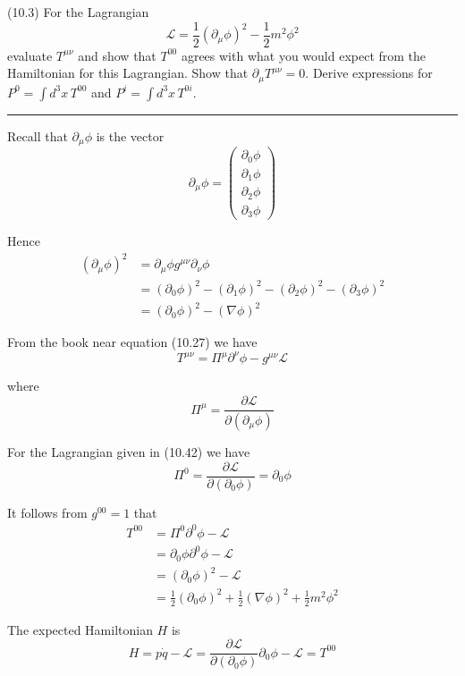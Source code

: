 \documentclass[12pt]{article}
\begin{document}
(10.3)
For the Lagrangian
\begin{equation*}
\mathcal L=\frac{1}{2}(\partial_\mu\phi)^2-\frac{1}{2}m^2\phi^2
\tag{10.42}
\end{equation*}
evaluate $T^{\mu\nu}$ and show that $T^{00}$ agrees with what
you would expect from the Hamiltonian for this Lagrangian.
Show that $\partial_\mu T^{\mu\nu}=0$. Derive expressions
for $P^0=\int d^3x\,T^{00}$ and $P^i=\int d^3x\,T^{0i}$.

\bigskip
\hrule

\bigskip
Recall that $\partial_\mu\phi$ is the vector
\begin{equation*}
\partial_\mu\phi=\begin{pmatrix}
\partial_0\phi
\\
\partial_1\phi
\\
\partial_2\phi
\\
\partial_3\phi
\end{pmatrix}
\end{equation*}

Hence
\begin{align*}
(\partial_\mu\phi)^2
&=\partial_\mu\phi g^{\mu\nu}\partial_\nu\phi
\\
&=(\partial_0\phi)^2-(\partial_1\phi)^2-(\partial_2\phi)^2-(\partial_3\phi)^2
\\
&=(\partial_0\phi)^2-(\nabla\phi)^2
\end{align*}

From the book near equation (10.27) we have
\begin{equation*}
T^{\mu\nu}=\Pi^\mu\partial^\nu\phi-g^{\mu\nu}\mathcal L
\end{equation*}

where
\begin{equation*}
\Pi^\mu=\frac{\partial\mathcal L}{\partial(\partial_\mu\phi)}
\end{equation*}

For the Lagrangian given in (10.42) we have
\begin{equation*}
\Pi^0=\frac{\partial\mathcal L}{\partial(\partial_0\phi)}=\partial_0\phi
\end{equation*}

It follows from $g^{00}=1$ that
\begin{align*}
T^{00}
&=\Pi^0\partial^0\phi-\mathcal L
\\
&=\partial_0\phi\partial^0\phi-\mathcal L
\\
&=(\partial_0\phi)^2-\mathcal L
\\
&=\frac{1}{2}(\partial_0\phi)^2+\frac{1}{2}(\nabla\phi)^2+\frac{1}{2}m^2\phi^2
\end{align*}

The expected Hamiltonian $H$ is
\begin{equation*}
H=p\dot q-\mathcal L
=\frac{\partial\mathcal L}{\partial(\partial_0\phi)}\partial_0\phi-\mathcal L
=T^{00}
\end{equation*}
\end{document}
